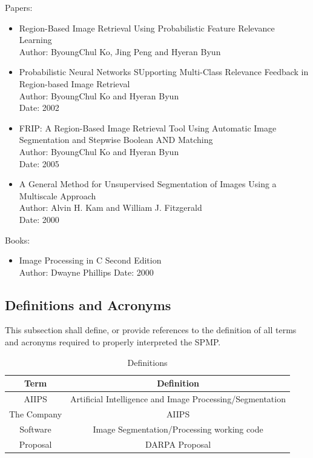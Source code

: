 \documentclass[12pt]{article}
\begin{document}
Papers:
\begin{itemize}
  \item Region-Based Image Retrieval Using Probabilistic Feature Relevance Learning\\
        Author: ByoungChul Ko, Jing Peng and Hyeran Byun
  \item Probabilistic Neural Networks SUpporting Multi-Class Relevance Feedback in Region-based Image Retrieval\\
        Author: ByoungChul Ko and Hyeran Byun\\
        Date: 2002
  \item FRIP: A Region-Based Image Retrieval Tool Using Automatic Image Segmentation and Stepwise Boolean AND Matching\\
        Author: ByoungChul Ko and Hyeran Byun\\
        Date: 2005
  \item A General Method for Unsupervised Segmentation of Images Using a Multiscale Approach\\
        Author: Alvin H. Kam and William J. Fitzgerald\\
        Date: 2000
\end{itemize}

Books:
\begin{itemize}
  \item Image Processing in C Second Edition\\
        Author: Dwayne Phillips
        Date: 2000
\end{itemize}

\subsection{Definitions and Acronyms}
This subsection shall define, or provide references to the definition of all terms and acronyms required to properly interpreted the SPMP.
\begin{table}[H]\centering
\begin{tabular}{|c|c|}
  \hline
  Term & Definition \\
   \hline
   AIIPS & Artificial Intelligence and Image Processing/Segmentation   \\
   \hline
   The Company & AIIPS \\
   \hline
   Software & Image Segmentation/Processing working code\\
   \hline
   Proposal & DARPA Proposal\\
   \hline
\end{tabular}
\caption{Definitions}
\end{table}
\end{document}
